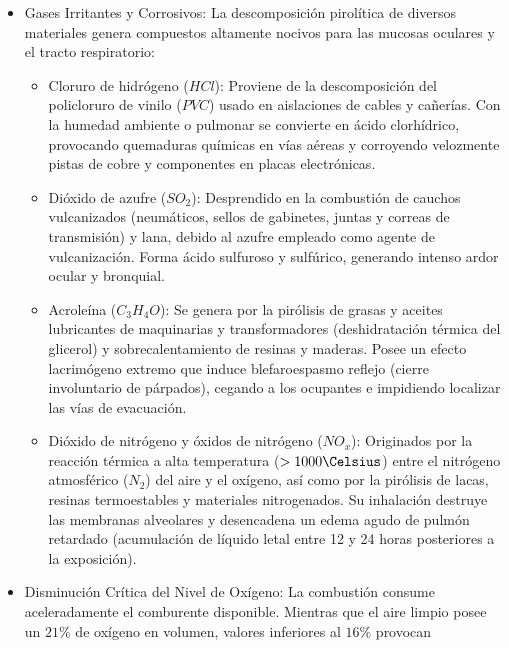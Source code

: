 \begin{itemize}
    \item Gases Irritantes y Corrosivos: La descomposición pirolítica de diversos materiales genera compuestos altamente
          nocivos para las mucosas oculares y el tracto respiratorio:
          \begin{itemize}
              \item Cloruro de hidrógeno ($HCl$): Proviene de la descomposición del policloruro de vinilo ($PVC$) usado en
                    aislaciones de cables y cañerías. Con la humedad ambiente o pulmonar se convierte en ácido clorhídrico,
                    provocando quemaduras químicas en vías aéreas y corroyendo velozmente pistas de cobre y componentes en placas
                    electrónicas.
              \item Dióxido de azufre ($SO_2$): Desprendido en la combustión de cauchos vulcanizados (neumáticos, sellos de
                    gabinetes, juntas y correas de transmisión) y lana, debido al azufre empleado como agente de vulcanización.
                    Forma ácido sulfuroso y sulfúrico, generando intenso ardor ocular y bronquial.
              \item Acroleína ($C_3H_4O$): Se genera por la pirólisis de grasas y aceites lubricantes de maquinarias y
                    transformadores (deshidratación térmica del glicerol) y sobrecalentamiento de resinas y maderas. Posee un
                    efecto lacrimógeno extremo que induce blefaroespasmo reflejo (cierre involuntario de párpados), cegando a
                    los ocupantes e impidiendo localizar las vías de evacuación.
              \item Dióxido de nitrógeno y óxidos de nitrógeno ($NO_x$): Originados por la reacción térmica a alta
                    temperatura ($>1000\Celsius$) entre el nitrógeno atmosférico ($N_2$) del aire y el oxígeno, así como por la
                    pirólisis de lacas, resinas termoestables y materiales nitrogenados. Su inhalación destruye las membranas
                    alveolares y desencadena un edema agudo de pulmón retardado (acumulación de líquido letal entre 12 y 24
                    horas posteriores a la exposición).
          \end{itemize}
    \item Disminución Crítica del Nivel de Oxígeno: La combustión consume aceleradamente el comburente disponible. Mientras
          que el aire limpio posee un $21\percent$ de oxígeno en volumen, valores inferiores al $16\percent$ provocan

\end{itemize}
